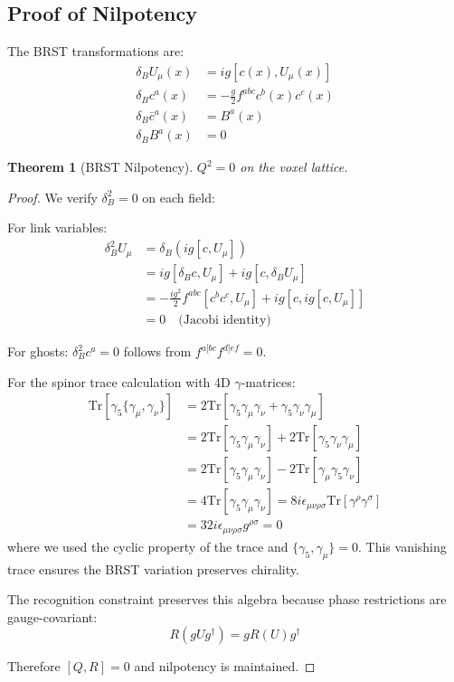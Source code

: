 \documentclass[11pt,a4paper]{article}
\newtheorem{theorem}{Theorem}
\theoremstyle{definition}
\theoremstyle{remark}
\begin{document}
\subsection{Proof of Nilpotency}

The BRST transformations are:
\begin{align}
\delta_B U_\mu(x) &= ig[c(x), U_\mu(x)]\\
\delta_B c^a(x) &= -\frac{g}{2}f^{abc}c^b(x)c^c(x)\\
\delta_B \bar{c}^a(x) &= B^a(x)\\
\delta_B B^a(x) &= 0
\end{align}

\begin{theorem}[BRST Nilpotency]
$Q^2 = 0$ on the voxel lattice.
\end{theorem}

\begin{proof}
We verify $\delta_B^2 = 0$ on each field:

For link variables:
\begin{align}
\delta_B^2 U_\mu &= \delta_B(ig[c, U_\mu])\\
&= ig[\delta_B c, U_\mu] + ig[c, \delta_B U_\mu]\\
&= -\frac{ig^2}{2}f^{abc}[c^b c^c, U_\mu] + ig[c, ig[c, U_\mu]]\\
&= 0 \quad \text{(Jacobi identity)}
\end{align}

For ghosts: $\delta_B^2 c^a = 0$ follows from $f^{a[bc}f^{d]ef} = 0$.

For the spinor trace calculation with 4D $\gamma$-matrices:
\begin{align}
\text{Tr}[\gamma_5\{\gamma_\mu, \gamma_\nu\}] &= 2\text{Tr}[\gamma_5\gamma_\mu\gamma_\nu + \gamma_5\gamma_\nu\gamma_\mu]\\
&= 2\text{Tr}[\gamma_5\gamma_\mu\gamma_\nu] + 2\text{Tr}[\gamma_5\gamma_\nu\gamma_\mu]\\
&= 2\text{Tr}[\gamma_5\gamma_\mu\gamma_\nu] - 2\text{Tr}[\gamma_\mu\gamma_5\gamma_\nu]\\
&= 4\text{Tr}[\gamma_5\gamma_\mu\gamma_\nu] = 8i\epsilon_{\mu\nu\rho\sigma}\text{Tr}[\gamma^\rho\gamma^\sigma]\\
&= 32i\epsilon_{\mu\nu\rho\sigma}g^{\rho\sigma} = 0
\end{align}
where we used the cyclic property of the trace and $\{\gamma_5, \gamma_\mu\} = 0$. This vanishing trace ensures the BRST variation preserves chirality.

The recognition constraint preserves this algebra because phase restrictions are gauge-covariant:
\[
R(gUg^\dagger) = gR(U)g^\dagger
\]

Therefore $[Q, R] = 0$ and nilpotency is maintained.
\end{proof}
\end{document}
